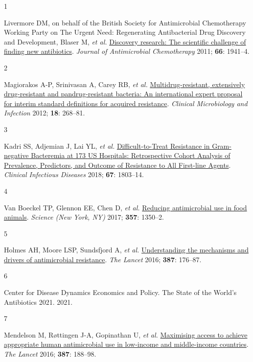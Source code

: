 \documentclass[
  11pt,
  paper=a4,
  ,captions=tableheading
]{scrartcl}
\newlength{\cslhangindent}
\newlength{\csllabelwidth}
\newenvironment{CSLReferences}[2] %
 {%
  \setlength{\parindent}{0pt}
  \ifodd #1 \everypar{\setlength{\hangindent}{\cslhangindent}}\ignorespaces\fi
  \ifnum #2 > 0
  \setlength{\parskip}{#2\baselineskip}
  \fi
 }%
 {}
\newcommand{\CSLLeftMargin}[1]{\parbox[t]{\csllabelwidth}{#1}}
\newcommand{\CSLRightInline}[1]{\parbox[t]{\linewidth - \csllabelwidth}{#1}\break}
\begin{document}
\hypertarget{refs}{}
\begin{CSLReferences}{0}{0}
\leavevmode{}%
\CSLLeftMargin{1 }
\CSLRightInline{Livermore DM, on behalf of the British Society for
Antimicrobial Chemotherapy Working Party on The Urgent Need:
Regenerating Antibacterial Drug Discovery and Development, Blaser M,
\emph{et al.} \href{https://doi.org/10.1093/jac/dkr262}{Discovery
research: The scientific challenge of finding new antibiotics}.
\emph{Journal of Antimicrobial Chemotherapy} 2011; \textbf{66}:
1941--4.}

\leavevmode{}%
\CSLLeftMargin{2 }
\CSLRightInline{Magiorakos A-P, Srinivasan A, Carey RB, \emph{et al.}
\href{https://doi.org/10.1111/j.1469-0691.2011.03570.x}{Multidrug-resistant,
extensively drug-resistant and pandrug-resistant bacteria: An
international expert proposal for interim standard definitions for
acquired resistance}. \emph{Clinical Microbiology and Infection} 2012;
\textbf{18}: 268--81.}

\leavevmode{}%
\CSLLeftMargin{3 }
\CSLRightInline{Kadri SS, Adjemian J, Lai YL, \emph{et al.}
\href{https://doi.org/10.1093/cid/ciy378}{Difficult-to-{Treat
Resistance} in {Gram-negative Bacteremia} at 173 {US Hospitals}:
{Retrospective Cohort Analysis} of {Prevalence}, {Predictors}, and
{Outcome} of {Resistance} to {All First-line Agents}}. \emph{Clinical
Infectious Diseases} 2018; \textbf{67}: 1803--14.}

\leavevmode{}%
\CSLLeftMargin{4 }
\CSLRightInline{Van Boeckel TP, Glennon EE, Chen D, \emph{et al.}
\href{https://doi.org/10.1126/science.aao1495}{Reducing antimicrobial
use in food animals}. \emph{Science (New York, NY)} 2017; \textbf{357}:
1350--2.}

\leavevmode{}%
\CSLLeftMargin{5 }
\CSLRightInline{Holmes AH, Moore LSP, Sundsfjord A, \emph{et al.}
\href{https://doi.org/10.1016/S0140-6736(15)00473-0}{Understanding the
mechanisms and drivers of antimicrobial resistance}. \emph{The Lancet}
2016; \textbf{387}: 176--87.}

\leavevmode{}%
\CSLLeftMargin{6 }
\CSLRightInline{Center for Disease Dynamics Economics and Policy. The
{State} of the {World}'s {Antibiotics} 2021. 2021.}

\leavevmode{}%
\CSLLeftMargin{7 }
\CSLRightInline{Mendelson M, Røttingen J-A, Gopinathan U, \emph{et al.}
\href{https://doi.org/10.1016/S0140-6736(15)00547-4}{Maximising access
to achieve appropriate human antimicrobial use in low-income and
middle-income countries}. \emph{The Lancet} 2016; \textbf{387}:
188--98.}


\end{CSLReferences}
\end{document}
